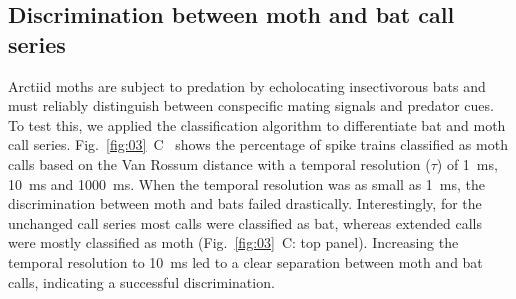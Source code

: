 \documentclass[12pt,a4paper]{article}
\newcommand{\fig}[2]{(Fig.~#1~#2)}
\begin{document}
\subsection{Discrimination between moth and bat call series}
Arctiid moths are subject to predation by echolocating insectivorous bats and must reliably distinguish between conspecific mating signals and predator cues. To test this, we applied the classification algorithm to differentiate bat and moth call series. Fig.~\ref{fig:03}~C~ shows the percentage of spike trains classified as moth calls based on the Van Rossum distance with a temporal resolution ($ \tau $) of 1~ms, 10~ms and 1000~ms. When the temporal resolution was as small as 1~ms, the discrimination between moth and bats failed drastically. Interestingly, for the unchanged call series most calls were classified as bat, whereas extended calls were mostly classified as moth \fig{\ref{fig:03}}{C: top panel}. Increasing the temporal resolution to 10~ms led to a clear separation between moth and bat calls, indicating a successful discrimination.
\end{document}
